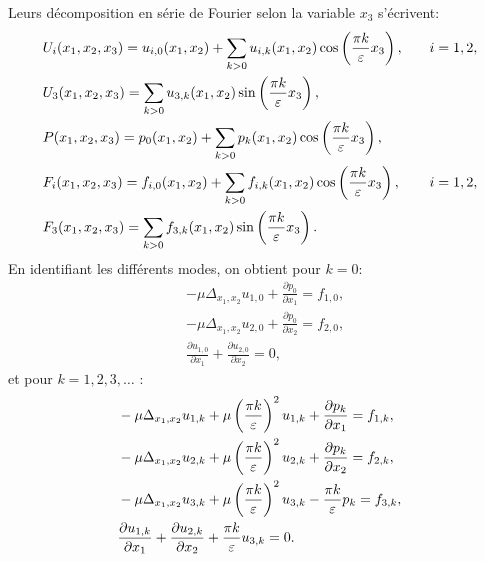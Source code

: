 Leurs décomposition en série de Fourier selon la variable $x_3$ s'écrivent:
\begin{align}
  &U_i(x_1, x_2, x_3) = u_{i,0}(x_1, x_2) %
                       + \sum_{k > 0} u_{i,k}(x_1, x_2)%
                       \cos\parent{\frac{\pi k}{\thickness}x_3}, &\quad i = 1, 2,\label{eq:fourier-coeff-def-1}\\
  &U_3(x_1, x_2, x_3) = \sum_{k > 0} u_{3,k}(x_1, x_2)%
                        \sin\parent{\frac{\pi k}{\thickness}x_3},\label{eq:fourier-coeff-def-2}\\
  &P(x_1, x_2, x_3) = p_0(x_1, x_2) %
                      + \sum_{k>0}p_k(x_1, x_2)%
                      \cos\parent{\frac{\pi k}{\thickness}x_3},\label{eq:fourier-coeff-def-3}\\
  &F_i(x_1, x_2, x_3) = f_{i, 0}(x_1, x_2) %
                        + \sum_{k > 0}f_{i,k}(x_1, x_2)%
                        \cos\parent{\frac{\pi k}{\thickness}x_3}, &\quad i = 1,2,\label{eq:fourier-coeff-def-4}\\
  &F_3(x_1, x_2, x_3) = \sum_{k > 0}f_{3,k}(x_1,x_2)%
                        \sin\parent{\frac{\pi k}{\thickness}x_3}.\label{eq:fourier-coeff-def-5}
\end{align}
En identifiant les différents modes, on obtient pour $k = 0$:
\begin{align}
  &-\mu \Delta_{x_1, x_2}u_{1, 0} + \frac{\partial p_0}{\partial x_1} %
  = f_{1,0},\label{eq:fourier-fund-1}\\
  &-\mu \Delta_{x_1, x_2}u_{2, 0} + \frac{\partial p_0}{\partial x_2} %
  = f_{2,0},\label{eq:fourier-fund-2}\\
  &\frac{\partial u_{1, 0}}{\partial x_1} +   \frac{\partial u_{2, 0}}{\partial x_2} %
  = 0,\label{eq:fourier-fund-3}
\end{align}
et pour $k = 1, 2, 3,\dots$ :
\begin{align}
  &- \mu\Delta_{x_1, x_2}u_{1, k}%
  + \mu\parent{\frac{\pi k}{\thickness}}^2 u_{1,k}%
  + \frac{\partial p_k}{\partial x_1} %
  = f_{1,k}, \label{eq:fourier-harm-1}\\
  &- \mu\Delta_{x_1, x_2}u_{2, k} %
  + \mu\parent{\frac{\pi k}{\thickness}}^2 u_{2,k} %
  + \frac{\partial p_k}{\partial x_2} %
  = f_{2,k}, \label{eq:fourier-harm-2} \\
  &- \mu\Delta_{x_1, x_2}u_{3, k} %
  + \mu\parent{\frac{\pi k}{\thickness}}^2 u_{3,k} %
  - \frac{\pi k}{\thickness}p_k %
  = f_{3,k}, \label{eq:fourier-harm-3}\\
  &  \frac{\partial u_{1,k}}{\partial x_1} %
  + \frac{\partial u_{2,k}}{\partial x_2} %
  + \frac{\pi k}{\thickness} u_{3, k} %
  = 0. \label{eq:fourier-incompressibility}
\end{align}
